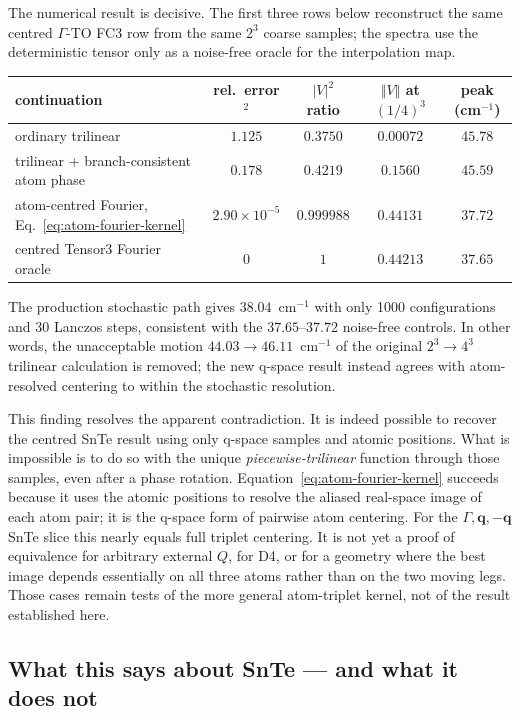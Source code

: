 \documentclass[11pt,a4paper]{article}
\newcommand{\qv}{\mathbf{q}}
\begin{document}
The numerical result is decisive.  The first three rows below reconstruct
the same centred $\Gamma$-TO FC3 row from the same $2^3$ coarse samples;
the spectra use the deterministic tensor only as a noise-free oracle for
the interpolation map.
\begin{center}
\small
\begin{tabular}{lcccc}
\toprule
continuation & rel.\ error$^2$ & $|V|^2$ ratio &
$\Vert V\Vert$ at $(1/4)^3$ & peak (cm$^{-1}$)\\
\midrule
ordinary trilinear & $1.125$ & $0.3750$ & $0.00072$ & $45.78$\\
trilinear + branch-consistent atom phase & $0.178$ & $0.4219$ & $0.1560$ & $45.59$\\
atom-centred Fourier, Eq.~\eqref{eq:atom-fourier-kernel} &
$2.90\times10^{-5}$ & $0.999988$ & $0.44131$ & $37.72$\\
centred Tensor3 Fourier oracle & $0$ & $1$ & $0.44213$ & $37.65$\\
\bottomrule
\end{tabular}
\end{center}
The production stochastic path gives $38.04$~cm$^{-1}$ with only 1000
configurations and 30 Lanczos steps, consistent with the $37.65$--$37.72$
noise-free controls.  In other words, the unacceptable motion
$44.03\to46.11$~cm$^{-1}$ of the original $2^3\to4^3$ trilinear calculation
is removed; the new q-space result instead agrees with atom-resolved
centering to within the stochastic resolution.

This finding resolves the apparent contradiction.  It is indeed possible
to recover the centred SnTe result using only q-space samples and atomic
positions.  What is impossible is to do so with the unique
\emph{piecewise-trilinear} function through those samples, even after a
phase rotation.  Equation~\eqref{eq:atom-fourier-kernel} succeeds because
it uses the atomic positions to resolve the aliased real-space image of
each atom pair; it is the q-space form of pairwise atom centering.  For the
$\Gamma,\qv,-\qv$ SnTe slice this nearly equals full triplet centering.
It is not yet a proof of equivalence for arbitrary external $Q$, for D4,
or for a geometry where the best image depends essentially on all three
atoms rather than on the two moving legs.  Those cases remain tests of the
more general atom-triplet kernel, not of the result established here.

\subsection{What this says about SnTe --- and what it does not}
\label{sec:topo-honest}
\end{document}
